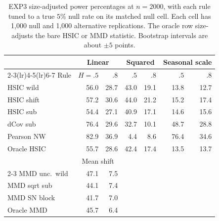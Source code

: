 \documentclass[11pt]{article}
\theoremstyle{remark}
\begin{document}
\begin{table}[H]
\centering\footnotesize
\setlength{\tabcolsep}{4pt}
\caption{EXP3 size-adjusted power percentages at $n=2000$, with each rule tuned to a true $5\%$ null rate on its matched null cell. Each cell has 1,000 null and 1,000 alternative replications. The oracle row size-adjusts the bare HSIC or MMD statistic. Bootstrap intervals are about $\pm5$ points.}\label{tab:power}
\begin{tabular}{@{}lrrrrrr@{}}
\toprule
& \multicolumn{2}{c}{Linear} & \multicolumn{2}{c}{Squared} & \multicolumn{2}{c}{Seasonal scale} \\
\cmidrule(lr){2-3}\cmidrule(lr){4-5}\cmidrule(lr){6-7}
Rule & $H=.5$ & $.8$ & $.5$ & $.8$ & $.5$ & $.8$ \\
\midrule
HSIC wild & 56.0 & 28.7 & 43.0 & 19.1 & 13.8 & 12.7 \\
HSIC shift & 57.2 & 30.6 & 44.0 & 21.2 & 15.2 & 17.4 \\
HSIC sub & 54.4 & 27.1 & 40.9 & 17.1 & 14.6 & 15.6 \\
dCov sub & 76.4 & 29.6 & 32.7 & 10.1 & 48.7 & 28.8 \\
Pearson NW & 82.9 & 36.9 & 4.4 & 8.6 & 76.4 & 34.6 \\
Oracle HSIC & 55.7 & 28.6 & 42.4 & 17.4 & 13.5 & 13.7 \\
\midrule
& \multicolumn{2}{c}{Mean shift} & & & & \\
\cmidrule(lr){2-3}
MMD unc.\ wild & 47.1 & 7.5 & & & & \\
MMD sqrt sub & 44.1 & 7.4 & & & & \\
MMD SN block & 41.7 & 7.0 & & & & \\
Oracle MMD & 45.7 & 6.4 & & & & \\
\bottomrule
\end{tabular}
\end{table}
\end{document}
